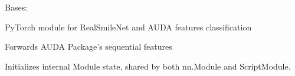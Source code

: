 \documentclass[letterpaper,10pt,english]{sphinxmanual}
\begin{document}
\begin{fulllineitems}
\label{\detokenize{model:model.DeepSmileNet}}
\pysigstartsignatures
{}
\pysigstopsignatures
\sphinxAtStartPar
Bases: 

\sphinxAtStartPar
PyTorch module for RealSmileNet and AUDA features classification

\begin{fulllineitems}
\label{\detokenize{model:model.DeepSmileNet.__forward_au_features}}
\pysigstartsignatures
{}
\pysigstopsignatures
\sphinxAtStartPar
Forwards AUDA Package’s sequential features

\end{fulllineitems}


\begin{fulllineitems}
\label{\detokenize{model:model.DeepSmileNet.__init__}}
\pysigstartsignatures
{}
\pysigstopsignatures
\sphinxAtStartPar
Initializes internal Module state, shared by both nn.Module and ScriptModule.

\end{fulllineitems}


\begin{fulllineitems}
\label{\detokenize{model:model.DeepSmileNet.__module__}}
\pysigstartsignatures
{}
\pysigstopsignatures
\end{fulllineitems}


\end{fulllineitems}
\end{document}
